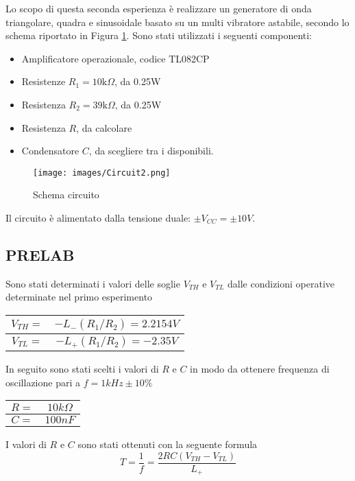 Lo scopo di questa seconda esperienza è realizzare un generatore di onda triangolare, quadra e sinusoidale basato su un multi vibratore astabile, secondo lo schema riportato in Figura \ref{fig:Circuit2}. Sono stati utilizzati i seguenti componenti:
\begin{itemize}
    \item Amplificatore operazionale, codice TL082CP
    \item Resistenze $R_1=10\text{k}\Omega$, da 0.25W 
    \item Resistenza $R_2=39\text{k}\Omega$, da 0.25W 
    \item Resistenza $R$, da calcolare
    \item Condensatore $C$, da scegliere tra i disponibili.
\end{itemize}
\begin{figure}[H]
    \centering
    \texttt{[image: images/Circuit2.png]}
    \caption{Schema circuito}
    \label{fig:Circuit2}
\end{figure}
Il circuito è alimentato dalla tensione duale: $\pm V_{CC}=\pm 10V$.
\subsection{PRELAB}
Sono stati determinati i valori delle soglie $V_{TH}$ e $V_{TL}$ dalle condizioni operative determinate nel primo esperimento
\begin{table}[H]
    \centering
    \begin{tabular}{|c|c|}
        \hline
        $V_{TH}=$& $-L_-(R_1/R_2)=2.2154V$  \\\hline
        $V_{TL}=$& $-L_+(R_1/R_2)=-2.35V$ \\\hline
    \end{tabular}
\end{table}
In seguito sono stati scelti i valori di $R$ e $C$ in modo da ottenere frequenza di oscillazione pari a $f=1kHz\pm10\%$
\begin{table}[H]
    \centering
    \begin{tabular}{|c|c|}
        \hline
        $R=$& $10k\Omega$ \\\hline
        $C=$& $100nF$ \\\hline
    \end{tabular}
    
\end{table}
I valori di $R$ e $C$ sono stati ottenuti con la seguente formula
\begin{equation}
    T = \frac{1}{f} = \frac{2RC(V_{TH}-V_{TL})}{L_+}
\end{equation}
